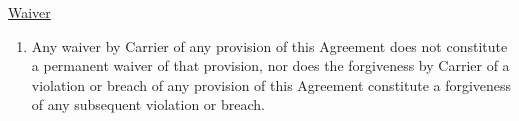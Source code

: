 \underline{Waiver}
\begin{enumerate}
    \item Any waiver by Carrier of any provision of this Agreement does not
    constitute a permanent waiver of that provision, nor does the
    forgiveness by Carrier of a violation or breach of any provision of
    this Agreement constitute a forgiveness of any subsequent violation or
    breach.
\end{enumerate}